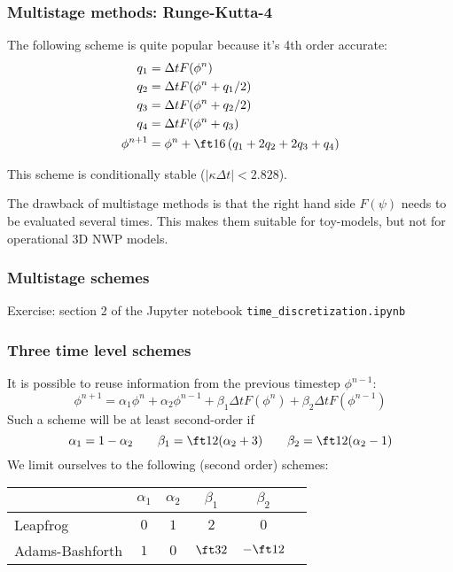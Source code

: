 \documentclass[aspectratio=43,9pt]{beamer}
\begin{document}
%
%
%
\begin{frame}
	\frametitle{Multistage methods: Runge-Kutta-4}
	The following scheme is quite popular because it's 4th order accurate:
	\begin{align*}
		q_1&=\Delta tF(\phi^n)	\\
		q_2&=\Delta tF(\phi^n+q_1/2)	\\
		q_3&=\Delta tF(\phi^n+q_2/2)	\\
		q_4&=\Delta tF(\phi^n+q_3)	\\
		\phi^{n+1}&=\phi^n+\ft16\left(q_1+2q_2+2q_3+q_4\right)
	\end{align*}
	\par
	This scheme is conditionally stable ($|\kappa\Delta t|<2.828$).
	\vspace*{3mm}\par
	The drawback of multistage methods is that the right hand side $F(\psi)$ needs to be evaluated several times. This makes them suitable for toy-models, but not for operational 3D NWP models.
\end{frame}
%
%
\begin{frame}
	\frametitle{Multistage schemes}
	Exercise: section 2 of the Jupyter notebook \texttt{time\_discretization.ipynb}
\end{frame}
%
%
\begin{frame}
	\frametitle{Three time level schemes}
	It is possible to reuse information from the previous timestep $\phi^{n-1}$:
	\begin{equation*}
		\phi^{n+1} = \alpha_1 \phi^n + \alpha_2 \phi^{n-1} + \beta_1 \Delta t F ( \phi^n ) +\beta_2 \Delta t F ( \phi^{n-1} )
	\end{equation*}
	Such a scheme will be at least second-order if
	\begin{equation*}
		\alpha_1 = 1 - \alpha_2 \qquad  \beta_1 = \ft12 ( \alpha_2 +3 ) \qquad  \beta_2 = \ft12 ( \alpha_2 -1 )
	\end{equation*}
	We limit ourselves to the following (second order) schemes:
	\begin{center}
		\def\arraystretch{1.5}
		\begin{tabular}{lccccl}
				&	$\alpha_1$	&	$\alpha_2$	&	$\beta_1$	&	$\beta_2$	\\
			\hline
				Leapfrog & $0$ & $1$ & $2$ & $0$	\\
				Adams-Bashforth & $1$ & $0$ & $\ft32$ & $-\ft12$
		\end{tabular}
	\end{center}
\end{frame}
\end{document}
